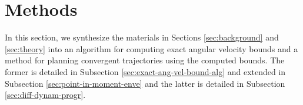 \documentclass[conference]{IEEEtran}
\newcommand\numberthis{\addtocounter{equation}{1}\tag{\theequation}}
\begin{document}




\section{Methods}\label{sec:methods}

In this section, we synthesize the materials in Sections
\ref{sec:background} and \ref{sec:theory} into an algorithm for
computing exact angular velocity bounds and a method for planning
convergent trajectories using the computed bounds. The former is
detailed in Subsection \ref{sec:exact-ang-vel-bound-alg} and extended
in Subsection \ref{sec:point-in-moment-enve} and the latter is
detailed in Subsection \ref{sec:diff-dynam-progr}.
\end{document}
